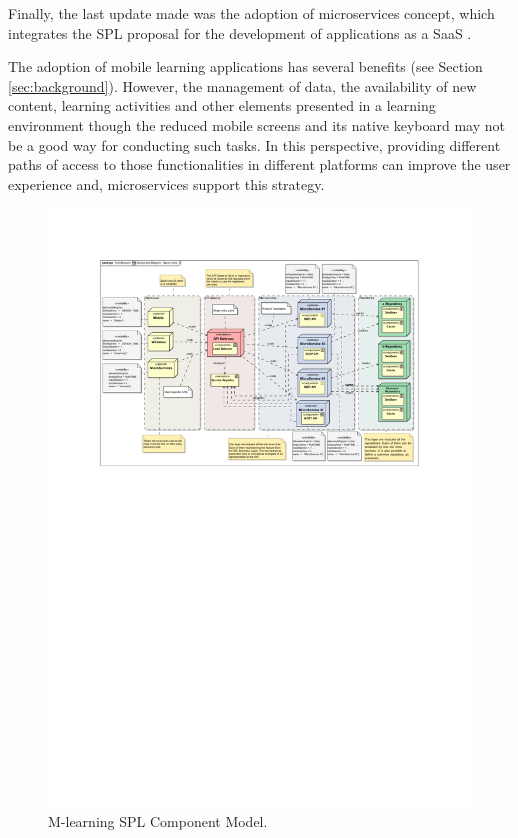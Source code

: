 Finally, the last update made was the adoption of microservices concept, which integrates the SPL proposal for the development of applications as a SaaS \cite{Newman:2015:BM:2904388}. 

The adoption of mobile learning applications has several benefits (see Section \ref{sec:background}). However, the management of data, the availability of new content, learning activities and other elements presented in a learning environment though the reduced mobile screens and its native keyboard may not be a good way for conducting such tasks. In this perspective, providing different paths of access to those functionalities in different platforms can improve the user experience and, microservices support this strategy.


\begin{figure}[!ht]
    \centering
    \includegraphics[scale=1.00]{component.pdf}
    \caption{M-learning SPL Component Model.}
    \label{fig:comp}
\end{figure}

